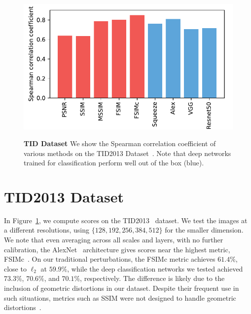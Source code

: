 \begin{figure}[h!]
\centering 
\includegraphics[width=1.\linewidth]{imgs/resultsTID.pdf} \\
\vspace{-2mm}
\caption{\label{fig:tid}
\textbf{TID Dataset} We show the Spearman correlation coefficient of various methods on the TID2013 Dataset~\cite{ponomarenko2015image}. Note that deep networks trained for classification perform well out of the box (blue).
}
\vspace{-3mm}
\end{figure}

\section{TID2013 Dataset}
\label{sec:tid}

In Figure~\ref{fig:tid}, we compute scores on the TID2013~\cite{ponomarenko2015image} dataset. 
We test the images at a different resolutions, using $\{128, 192, 256, 384, 512\}$ for the smaller dimension. 
We note that even averaging across all scales and layers, with no further calibration, the AlexNet~\cite{krizhevsky2014one} architecture gives scores near the highest metric, FSIMc~\cite{zhang2011fsim}. On our traditional perturbations, the FSIMc metric achieves $61.4\%$, close to $\ell_2$ at $59.9\%$, while the deep classification networks we tested achieved $73.3\%$, $70.6\%$, and $70.1\%$, respectively. The difference is likely due to the inclusion of geometric distortions in our dataset. Despite their frequent use in such situations, metrics such as SSIM were not designed to handle geometric distortions~\cite{sampat2009complex}.
